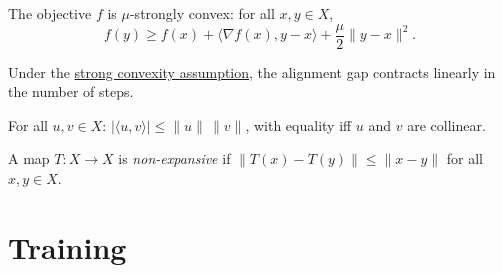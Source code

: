\documentclass[11pt]{article}
\begin{document}
\begin{mainpart}
\begin{figure}
\label{fig:arch}
\end{figure}

\begin{assumption}
The objective \(f\) is $\mu$-strongly convex: for all \( x, y \in X \),
\begin{equation}\label{eq:strong_convexity}
f(y) \geq f(x) + \langle \nabla f(x), y - x \rangle + \frac{\mu}{2} \|y - x\|^2.
\end{equation}
\end{assumption}

Under the \hyperlink{assumption:strong_convexity}{strong convexity assumption},
the alignment gap contracts linearly in the number of steps.

\begin{lemma}
For all \( u, v \in X \): \( |\langle u, v \rangle| \le \|u\|\,\|v\| \),
with equality iff \( u \) and \( v \) are collinear.
\end{lemma}

\begin{definition}
A map \( T: X \to X \) is \emph{non-expansive} if
\( \|T(x) - T(y)\| \le \|x - y\| \) for all \( x, y \in X \).
\end{definition}

\columnbreak

\section*{Training}


\end{mainpart}
\end{document}

